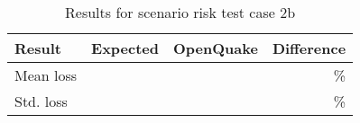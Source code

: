 \begin{table}[htbp]

\centering
\begin{tabular}{ l r r r }

\hline
\rowcolor{anti-flashwhite}
\bf{Result} & \bf{Expected} & \bf{OpenQuake} & \bf{Difference}\\
\hline
Mean loss &  &  & \% \\
Std. loss &  &  & \% \\
\hline
\end{tabular}

\caption{Results for scenario risk test case 2b}
\label{tab:result-scenario-risk-2b}
\end{table}